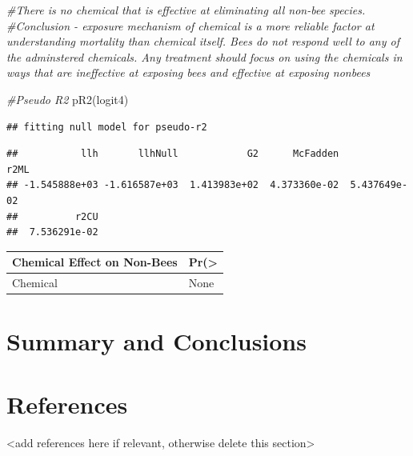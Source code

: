 \documentclass[
  12pt,
]{article}
\newenvironment{Shaded}{\begin{snugshade}}{\end{snugshade}}
\newcommand{\CommentTok}[1]{\textcolor[rgb]{0.56,0.35,0.01}{\textit{#1}}}
\newcommand{\FunctionTok}[1]{\textcolor[rgb]{0.00,0.00,0.00}{#1}}
\newcommand{\NormalTok}[1]{#1}
\begin{document}
\begin{Shaded}
\begin{Highlighting}[]
\CommentTok{\#There is no chemical that is effective at eliminating all non{-}bee species. }
\CommentTok{\#Conclusion {-} exposure mechanism of chemical is a more reliable factor at understanding mortality than chemical itself. Bees do not respond well to any of the adminstered chemicals. Any treatment should focus on using the chemicals in ways that are ineffective at exposing bees and effective at exposing nonbees}

\CommentTok{\#Pseudo R2}
 \FunctionTok{pR2}\NormalTok{(logit4)}
\end{Highlighting}
\end{Shaded}

\begin{verbatim}
## fitting null model for pseudo-r2
\end{verbatim}

\begin{verbatim}
##           llh       llhNull            G2      McFadden          r2ML 
## -1.545888e+03 -1.616587e+03  1.413983e+02  4.373360e-02  5.437649e-02 
##          r2CU 
##  7.536291e-02
\end{verbatim}

\begin{longtable}[]{@{}ll@{}}
\toprule
Chemical Effect on Non-Bees & Pr(\textgreater{} \\
\midrule
\endhead
Chemical & None \\
\bottomrule
\end{longtable}

\newpage

\hypertarget{summary-and-conclusions}{%
\section{Summary and Conclusions}\label{summary-and-conclusions}}

\newpage

\hypertarget{references}{%
\section{References}\label{references}}

\textless add references here if relevant, otherwise delete this
section\textgreater{}
\end{document}
